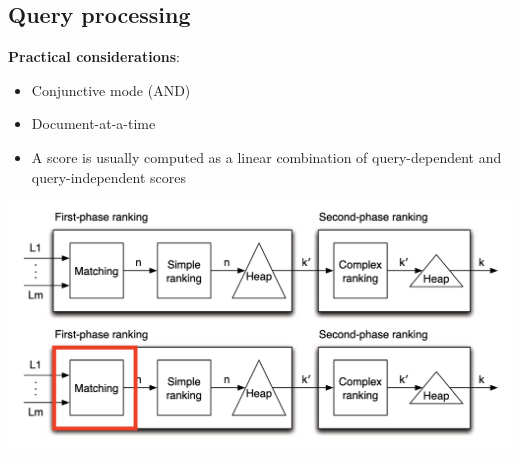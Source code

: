 \subsection{Query processing}
\begin{minipage}{.5\textwidth}
\textbf{Practical considerations}:
\begin{itemize}
    \setlength\itemsep{0em}
    \item Conjunctive mode (AND)
    \item Document-at-a-time
    \item A score is usually computed as a linear combination of query-dependent and query-independent scores
\end{itemize}
\end{minipage}
\begin{minipage}{.45\textwidth}
\includegraphics[scale=0.4]{figures/query-processing.png}
\end{minipage}

